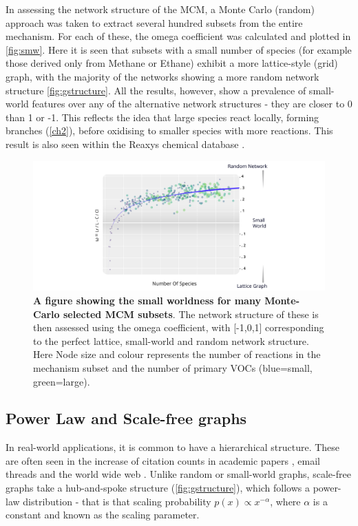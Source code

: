 In assessing the network structure of the MCM, a Monte Carlo (random) approach was taken to extract several hundred subsets from the entire mechanism. For each of these, the omega coefficient was calculated and plotted in \autoref{fig:smw}. Here it is seen that subsets with a small number of species (for example those derived only from Methane or Ethane) exhibit a more lattice-style (grid) graph, with the majority of the networks showing a more random network structure \autoref{fig:gstructure}. All the results, however, show a prevalence of small-world features over any of the alternative network structures - they are closer to 0 than 1 or -1. This reflects the idea that large species react locally, forming branches (\autoref{ch2}), before oxidising to smaller species with more reactions. This result is also seen within the Reaxys chemical database \citep{rscgraph}.



\begin{figure}[H]
     \centering
         \includegraphics[width=\textwidth]{figures_c3/logpart.pdf}
        \caption{\textbf{A figure showing the small worldness for many Monte-Carlo selected MCM subsets}. The network structure of these is then assessed using the omega coefficient, with [-1,0,1] corresponding to the perfect lattice, small-world and random network structure. Here Node size and colour represents the number of reactions in the mechanism subset and the number of primary VOCs (blue=small, green=large).}
        \label{fig:smw}
\end{figure}



\subsection{Power Law and Scale-free graphs}
In real-world applications, it is common to have a hierarchical structure. These are often seen in the increase of citation counts in academic papers \citep{scalefreepapers}, email threads \citep{scalefreeemail} and the world wide web \citep{neoj4}. Unlike random or small-world graphs, scale-free graphs take a hub-and-spoke structure (\autoref{fig:gstructure}), which follows a power-law distribution - that is that scaling probability $p(x) \propto x^{-\alpha}$, where $\alpha$ is a constant and known as the scaling parameter.

